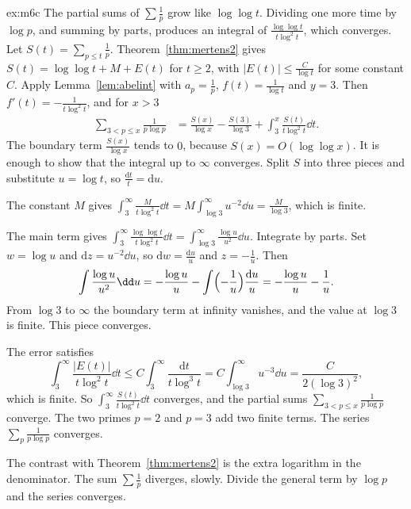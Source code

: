 \begin{solution}{ex:m6c}
\idea The partial sums of $\sum\frac1p$ grow like $\log\log t$. Dividing one more time by $\log p$, and summing by parts, produces an integral of $\frac{\log\log t}{t\log^2 t}$, which converges.
\writeup Let $S(t)=\sum_{p\le t}\frac1p$. Theorem~\ref{thm:mertens2} gives $S(t)=\log\log t+M+E(t)$ for $t\ge 2$, with $|E(t)|\le\frac C{\log t}$ for some constant $C$. Apply Lemma~\ref{lem:abelint} with $a_p=\frac1p$, $f(t)=\frac1{\log t}$ and $y=3$. Then $f'(t)=-\frac1{t\log^2 t}$, and for $x>3$
\begin{align*}
\sum_{3<p\le x}\frac1{p\log p}
&=\frac{S(x)}{\log x}-\frac{S(3)}{\log 3}+\int_3^x\frac{S(t)}{t\log^2 t}\dd t.
\end{align*}
The boundary term $\frac{S(x)}{\log x}$ tends to $0$, because $S(x)=O(\log\log x)$. It is enough to show that the integral up to $\infty$ converges. Split $S$ into three pieces and substitute $u=\log t$, so $\frac{\mathrm dt}t=\mathrm du$.

The constant $M$ gives $\int_3^\infty\frac{M}{t\log^2 t}\dd t=M\int_{\log 3}^\infty u^{-2}\dd u=\frac M{\log 3}$, which is finite.

The main term gives $\int_3^\infty\frac{\log\log t}{t\log^2 t}\dd t=\int_{\log 3}^\infty\frac{\log u}{u^2}\dd u$. Integrate by parts. Set $w=\log u$ and $\mathrm dz=u^{-2}\dd u$, so $\mathrm dw=\frac{\mathrm du}u$ and $z=-\frac1u$. Then
\[
\int\frac{\log u}{u^2}\dd u=-\frac{\log u}u-\int\Bigl(-\frac1u\Bigr)\frac{\mathrm du}u=-\frac{\log u}u-\frac1u.
\]
From $\log 3$ to $\infty$ the boundary term at infinity vanishes, and the value at $\log 3$ is finite. This piece converges.

The error satisfies
\[
\int_3^\infty\frac{|E(t)|}{t\log^2 t}\dd t\le C\int_3^\infty\frac{\mathrm dt}{t\log^3 t}=C\int_{\log 3}^\infty u^{-3}\dd u=\frac C{2(\log 3)^2},
\]
which is finite. So $\int_3^\infty\frac{S(t)}{t\log^2 t}\dd t$ converges, and the partial sums $\sum_{3<p\le x}\frac1{p\log p}$ converge. The two primes $p=2$ and $p=3$ add two finite terms. The series $\sum_p\frac1{p\log p}$ converges.

The contrast with Theorem~\ref{thm:mertens2} is the extra logarithm in the denominator. The sum $\sum\frac1p$ diverges, slowly. Divide the general term by $\log p$ and the series converges.
\end{solution}

